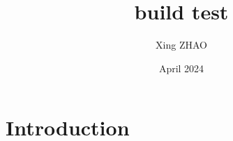 \documentclass{article}
\title{build test}
\author{Xing ZHAO}
\date{April 2024}
\begin{document}
\maketitle

\section{Introduction}
\end{document}
